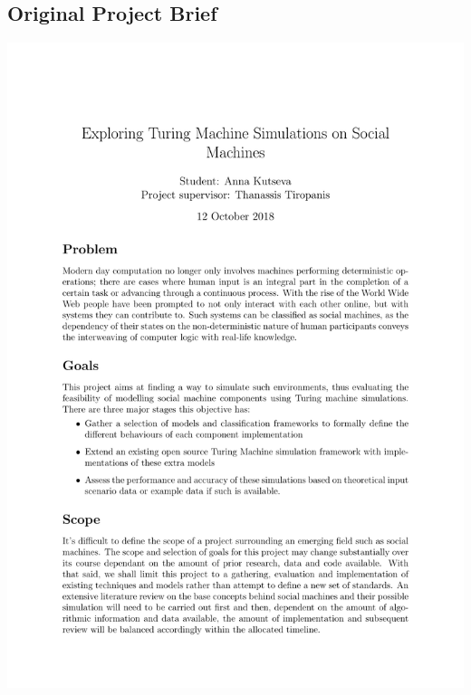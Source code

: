 \documentclass[12pt,a4,xcolor=table]{article}
\begin{document}
	\subsection{Original Project Brief}
	\includegraphics[width=\linewidth]{brief}
\end{document}
